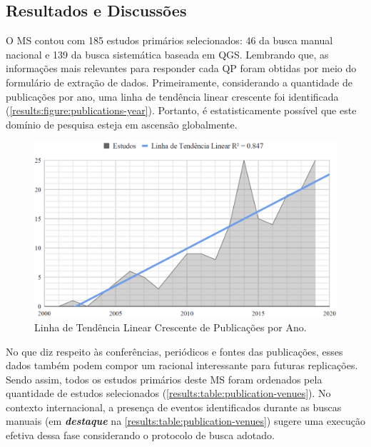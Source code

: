 \subsection{Resultados e Discussões}
\label{ms:resultados}

O MS contou com 185 estudos primários selecionados: 46 da busca manual nacional e 139 da busca sistemática baseada em QGS. Lembrando que, as informações mais relevantes para responder cada QP foram obtidas por meio do formulário de extração de dados. Primeiramente, considerando a quantidade de publicações por ano, uma linha de tendência linear crescente foi identificada (\autoref{results:figure:publications-year}). Portanto, é estatisticamente possível que este domínio de pesquisa esteja em ascensão globalmente.


\begin{figure}[htb]
\centering 
\caption{Linha de Tendência Linear Crescente de Publicações por Ano.}
\label{results:figure:publications-year}
\includegraphics[width=1\textwidth]{images/chapter2-sm-publications-timeline.png}
\fautor
\end{figure}


No que diz respeito às conferências, periódicos e fontes das publicações, esses dados também podem compor um racional interessante para futuras replicações. Sendo assim, todos os estudos primários deste MS foram ordenados pela quantidade de estudos selecionados (\autoref{results:table:publication-venues}). No contexto internacional, a presença de eventos identificados durante as buscas manuais (em \textbf{\textit{destaque}} na \autoref{results:table:publication-venues}) sugere uma execução efetiva dessa fase considerando o protocolo de busca adotado.

